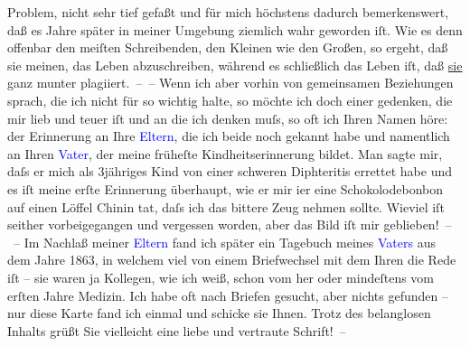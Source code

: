                Problem, nicht sehr tief gefaßt und für mich höchstens dadurch bemerkenswert, daß es
               Jahre später in meiner Umgebung ziemlich wahr geworden iſt. Wie es denn offenbar den
               meiſten Schreibenden, den Kleinen wie den Großen, so ergeht, {\pb}daß sie meinen, das Leben abzuschreiben, während es schließlich das Leben iſt, daß
                  \uline{sie} ganz munter plagiiert. – –\pend
           \pstart
           Wenn ich aber vorhin von gemeinsamen Beziehungen sprach, die ich nicht für so wichtig
               halte, so möchte ich doch einer gedenken, die mir lieb und teuer iſt und an die ich
               denken muſs, so oft ich Ihren Namen höre: der Erinnerung an Ihre \textcolor{blue}{Eltern}{}, die ich beide noch gekannt habe
               und namentlich an Ihren \textcolor{blue}{Vater}{},
               der meine früheſte Kindheitserinnerung bildet. Man sagte mir, daſs er mich als
               3jähriges Kind von einer schweren Diphteritis errettet habe und es iſt meine erſte
               Erinnerung überhaupt, wie er mir i{\geminationm}er eine
               Schokolodebonbon auf einen Löffel Chinin tat, daſs ich das bittere Zeug nehmen
               sollte. Wieviel iſt seither vorbeigegangen und vergessen worden, aber das Bild iſt
               mir geblieben! – – Im Nachlaß meiner \textcolor{blue}{Eltern}{} fand ich später ein Tagebuch meines \textcolor{blue}{Vaters}{} aus dem Jahre 1863, in
               welchem viel von \introOben{}einem Briefwechsel mit\introOben{} dem Ihren die Rede
               iſt – sie waren ja Kollegen, wie ich weiß, schon vom \label{K_L02572-4v}\label{K_L02572-4h} her oder mindeſtens vom erſten
               Jahre Medizin. Ich habe oft nach Briefen gesucht, aber nichts gefunden – nur diese
               Karte fand ich einmal und schicke sie Ihnen. Trotz {\pb}des
               belanglosen Inhalts grüßt Sie vielleicht eine liebe und vertraute Schrift! –\pend
